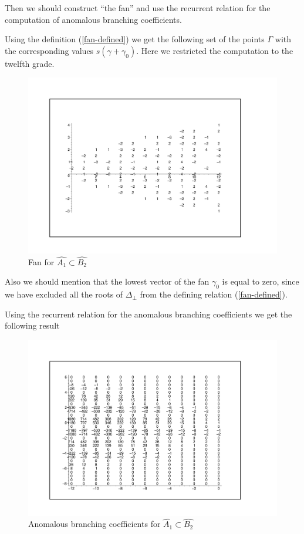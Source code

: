 \documentclass[a4paper,12pt]{article}
\theoremstyle{definition} \newtheorem{Def}{Definition}
\begin{document}
Then we should construct ``the fan'' and use the recurrent relation for the computation of anomalous branching coefficients.

Using the definition (\ref{fan-defined}) we get the following set of
the points $\Gamma$ with the corresponding values $s(\gamma+\gamma_0)$. 
Here we restricted the computation to the twelfth grade.
\begin{figure}[ph]
  \centering
  \includegraphics[width=130mm]{AffineB2_A1_fan.pdf}
  \caption{Fan for $\hat{A_1}\subset \hat{B_2}$}
  \label{fig:B4B2Fan}
\end{figure}

Also we should mention that the lowest vector of the fan $\gamma_0$ is equal to zero, since we have excluded all the roots of $\Delta_{\bot}$ from the defining relation (\ref{fan-defined}).

Using the recurrent relation for the anomalous branching coefficients we get the following result
\begin{figure}[ph]
  \centering
  \includegraphics[width=130mm]{AffineB2_A1_branching.pdf}
  \caption{Anomalous branching coefficients for $\hat{A_1}\subset \hat{B_2}$}
  \label{fig:AffineB2_A1_branching}
\end{figure}
\end{document}
